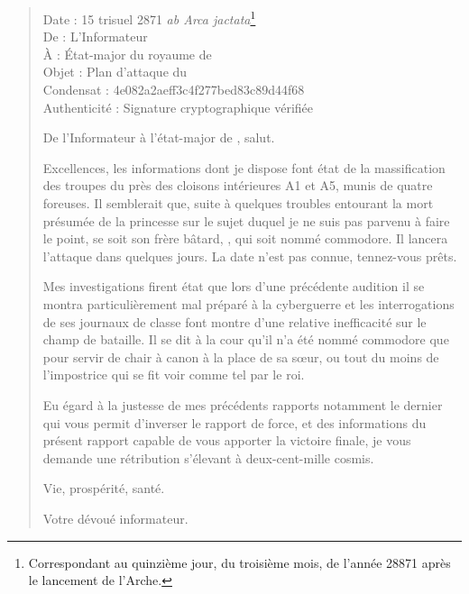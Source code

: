 \begin{quotation}
  \ttfamily\RaggedRight
  \noindent{}Date : 15 trisuel 2871 \emph{ab Arca jactata}\footnote{Correspondant au quinzième jour, du troisième mois, de l’année 28871 après le lancement de l’Arche.}\\
  De : L’Informateur\\
  À : État-major du royaume de \campoppose{}\\
  Objet : Plan d’attaque du \campprincipal{}\\
  Condensat : 4e082a2aeff3c4f277bed83c89d44f68\\
  Authenticité : Signature cryptographique vérifiée
  \nopagebreak\vspace{1em}

  De l’Informateur à l’état-major de \campoppose{}, salut.
  \nopagebreak\vspace{1em}

  Excellences, les informations dont je dispose font état de la massification des troupes du \campprincipal{} près des cloisons intérieures A1 et A5, munis de quatre foreuses. Il semblerait que, suite à quelques troubles entourant la mort présumée de la princesse \princesse sur le sujet duquel je ne suis pas parvenu à faire le point, se soit son frère bâtard, \elena, qui soit nommé commodore. Il lancera l’attaque dans quelques jours. La date n’est pas connue, tennez-vous prêts.

  Mes investigations firent état que lors d’une précédente audition il se montra particulièrement mal préparé à la cyberguerre et les interrogations de ses journaux de classe font montre d’une relative inefficacité sur le champ de bataille. Il se dit à la cour qu’il n’a été nommé commodore que pour servir de chair à canon à la place de sa sœur, ou tout du moins de l’impostrice qui se fit voir comme tel par le roi.

  Eu égard à la justesse de mes précédents rapports notamment le dernier qui vous permit d’inverser le rapport de force, et des informations du présent rapport capable de vous apporter la victoire finale, je vous demande une rétribution s’élevant à deux-cent-mille cosmis.

  \nopagebreak\vspace{1em}
  Vie, prospérité, santé.

  \nopagebreak\vspace{1em}
  \hfill Votre dévoué informateur.
\end{quotation}

